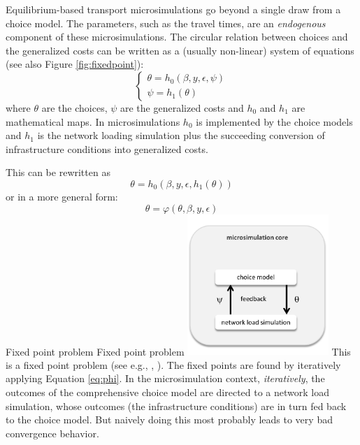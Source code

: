 Equilibrium-based transport microsimulations go beyond a single draw from a choice model. The parameters, such as the travel times, are an \emph{endogenous} component of these microsimulations. The circular relation between choices and the generalized costs can be written as a (usually non-linear) system of equations (see also Figure \ref{fig:fixedpoint}): 
\begin{equation}
\label{eq:initialSystem}
\begin{cases}
\theta = h_0(\beta, y, \epsilon, \psi) \\
\psi = h_1(\theta) 
\end{cases}
\end{equation}
where $\theta$ are the choices, $\psi$ are the generalized costs and $h_0$ and $h_1$ are mathematical maps. In microsimulations $h_0$ is implemented by the choice models and $h_1$ is the network loading simulation plus the succeeding conversion of infrastructure conditions into generalized costs. 

This can be rewritten as
\begin{equation}
\theta = h_0(\beta, y, \epsilon, h_1(\theta))
\end{equation}
%
or in a more general form:
%
\begin{equation}
\label{eq:phi}
\theta = \varphi(\theta, \beta, y, \epsilon) %
\end{equation}
%
%
\createfigure%
{Fixed point problem}%
{Fixed point problem}%
{\label{fig:fixedpoint}}%
{\includegraphics[width=0.4\textwidth, angle=0]{understanding/figures/fixedpoint.pdf}}%
{}
%
%
This is a fixed point problem (see e.g., \citet[][p.6]{RamaduraiUkkusuri_TechRep_RPI_2008}, \citet[][]{BierlaireCrittin_TransScience_2006, KaufmanEtAl_TransResC_1998, RamaduraiUkkusuri_NSE_2010}). The fixed points are found by iteratively applying Equation \ref{eq:phi}. In the microsimulation context, \emph{iteratively}, the outcomes of the comprehensive choice model are directed to a network load simulation, whose outcomes (the infrastructure conditions) are in turn fed back to the choice model. But naively doing this most probably leads to very bad convergence behavior.

